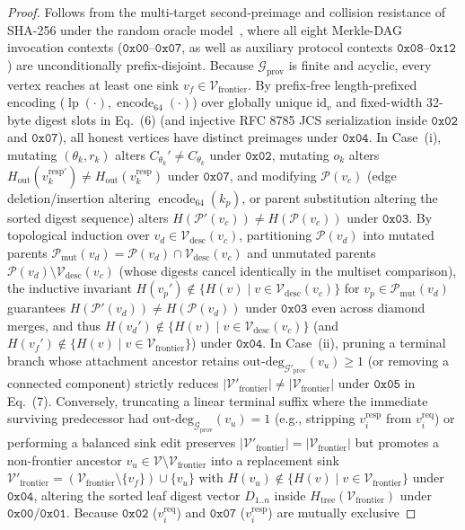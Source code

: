 \documentclass[conference,10pt]{IEEEtran}
\begin{document}
\begin{proof}
Follows from the multi-target second-preimage and collision resistance of SHA-256 under the random oracle model~\cite{merkle1987digital, bellare1993random}, where all eight Merkle-DAG invocation contexts ($\mathtt{0x00}$--$\mathtt{0x07}$, as well as auxiliary protocol contexts $\mathtt{0x08}$--$\mathtt{0x12}$) are unconditionally prefix-disjoint. Because $\mathcal{G}_{\text{prov}}$ is finite and acyclic, every vertex reaches at least one sink $v_f \in \mathcal{V}_{\text{frontier}}$. By prefix-free length-prefixed encoding ($\operatorname{lp}(\cdot), \operatorname{encode}_{64}(\cdot)$) over globally unique $\text{id}_v$ and fixed-width 32-byte digest slots in Eq.~(6) (and injective RFC 8785 JCS serialization inside $\mathtt{0x02}$ and $\mathtt{0x07}$), all honest vertices have distinct preimages under $\mathtt{0x04}$. In Case~(i), mutating $(\theta_k, r_k)$ alters $C_{\theta_k}' \neq C_{\theta_k}$ under $\mathtt{0x02}$, mutating $o_k$ alters $H_{\text{out}}(v_k^{\text{resp}\prime}) \neq H_{\text{out}}(v_k^{\text{resp}})$ under $\mathtt{0x07}$, and modifying $\mathcal{P}(v_c)$ (edge deletion/insertion altering $\operatorname{encode}_{64}(k_p)$, or parent substitution altering the sorted digest sequence) alters $H(\mathcal{P}'(v_c)) \neq H(\mathcal{P}(v_c))$ under $\mathtt{0x03}$. By topological induction over $v_d \in \mathcal{V}_{\text{desc}}(v_c)$, partitioning $\mathcal{P}(v_d)$ into mutated parents $\mathcal{P}_{\text{mut}}(v_d) = \mathcal{P}(v_d) \cap \mathcal{V}_{\text{desc}}(v_c)$ and unmutated parents $\mathcal{P}(v_d) \setminus \mathcal{V}_{\text{desc}}(v_c)$ (whose digests cancel identically in the multiset comparison), the inductive invariant $H(v_p') \notin \{H(v) \mid v \in \mathcal{V}_{\text{desc}}(v_c)\}$ for $v_p \in \mathcal{P}_{\text{mut}}(v_d)$ guarantees $H(\mathcal{P}'(v_d)) \neq H(\mathcal{P}(v_d))$ under $\mathtt{0x03}$ even across diamond merges, and thus $H(v_d') \notin \{H(v) \mid v \in \mathcal{V}_{\text{desc}}(v_c)\}$ (and $H(v_f') \notin \{H(v) \mid v \in \mathcal{V}_{\text{frontier}}\}$) under $\mathtt{0x04}$. In Case~(ii), pruning a terminal branch whose attachment ancestor retains $\text{out-deg}_{\mathcal{G}'_{\text{prov}}}(v_u) \ge 1$ (or removing a connected component) strictly reduces $|\mathcal{V}'_{\text{frontier}}| \neq |\mathcal{V}_{\text{frontier}}|$ under $\mathtt{0x05}$ in Eq.~(7). Conversely, truncating a linear terminal suffix where the immediate surviving predecessor had $\text{out-deg}_{\mathcal{G}_{\text{prov}}}(v_u) = 1$ (e.g., stripping $v_i^{\text{resp}}$ from $v_i^{\text{req}}$) or performing a balanced sink edit preserves $|\mathcal{V}'_{\text{frontier}}| = |\mathcal{V}_{\text{frontier}}|$ but promotes a non-frontier ancestor $v_u \in \mathcal{V} \setminus \mathcal{V}_{\text{frontier}}$ into a replacement sink $\mathcal{V}'_{\text{frontier}} = (\mathcal{V}_{\text{frontier}} \setminus \{v_f\}) \cup \{v_u\}$ with $H(v_u) \notin \{H(v) \mid v \in \mathcal{V}_{\text{frontier}}\}$ under $\mathtt{0x04}$, altering the sorted leaf digest vector $D_{1..n}$ inside $H_{\text{tree}}(\mathcal{V}_{\text{frontier}})$ under $\mathtt{0x00}/\mathtt{0x01}$. Because $\mathtt{0x02}$ ($v_i^{\text{req}}$) and $\mathtt{0x07}$ ($v_i^{\text{resp}}$) are mutually exclusive 
\end{proof}
\end{document}
